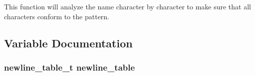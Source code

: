 This function will analyze the name character by character to make sure that all characters conform to the pattern. 

\subsection{Variable Documentation}
\subsubsection{\setlength{\rightskip}{0pt plus 5cm}\bf{newline\_\-table\_\-t} \bf{newline\_\-table}\hspace{0.3cm}{\tt  [static]}}\label{vqec__config__parser_8c_3f4dc7944712e1506f7ce59d7a7c72bd}


